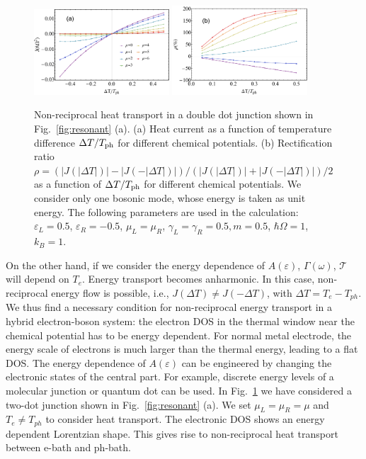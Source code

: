 \documentclass[aps,prb,
,floatfix,footinbib,shortbibliography,
preprint
]{revtex4-1}
\newcommand{\revision}[1]{{\color{blue}{#1}}}
\begin{document}
\begin{figure}[]
	    \includegraphics[width=0.45\textwidth,angle=0]{figures-0317/fig_3a.pdf}
	    \includegraphics[width=0.45\textwidth,angle=0]{figures-0317/fig_3b.pdf}	
	\caption{Non-reciprocal heat transport in a  double dot junction shown in Fig.~\ref{fig:resonant} (a). (a) Heat current as a function of temperature difference $\Delta T/T_{\rm ph}$ for different chemical potentials. (b) Rectification ratio $\rho=(|J(|\Delta T|)|-|J(-|\Delta T|)|)/(|J(|\Delta T|)|+|J(-|\Delta T|)|)/2$ as a function of $\Delta T/T_{\rm ph}$ for different chemical potentials. We consider only one bosonic mode, whose energy is taken as unit energy. The following parameters are used in the calculation: $\varepsilon_L=0.5$, $\varepsilon_R=-0.5$, $\mu_L=\mu_R$, $\gamma_L=\gamma_R=0.5,m=0.5$, $\hbar\Omega=1$, $k_B=1$. }
	\label{fig:JT}
\end{figure}

On the other hand, if we consider the energy dependence of $A(\varepsilon)$, $\Gamma(\omega)$, $\mathcal{T}^{}$ will depend on $T_e$. Energy transport becomes anharmonic. In this case, non-reciprocal energy flow is possible, i.e., $J(\Delta T)\neq J(-\Delta T)$, with $\Delta T=T_e-T_{ph}$. We thus find a necessary condition for non-reciprocal energy transport in a hybrid electron-boson system: the electron DOS in the thermal window near the chemical potential has to be energy dependent\cite{zhang2013thermal,ren2013heat}. For normal metal electrode, the energy scale of electrons is much larger than the thermal energy, leading to a flat DOS. The energy dependence of $A(\varepsilon)$ can be engineered by changing the electronic states of the central part. For example, discrete energy levels of a molecular junction or quantum dot can be used.
In Fig.~\ref{fig:JT} we have considered a two-dot junction shown in Fig.~\ref{fig:resonant} (a). We set $\mu_L=\mu_R=\mu$ and $T_e \neq T_{ph}$ to consider heat transport. The electronic DOS shows an energy dependent Lorentzian shape. This gives rise to non-reciprocal heat transport between e-bath and ph-bath. 
\end{document}

